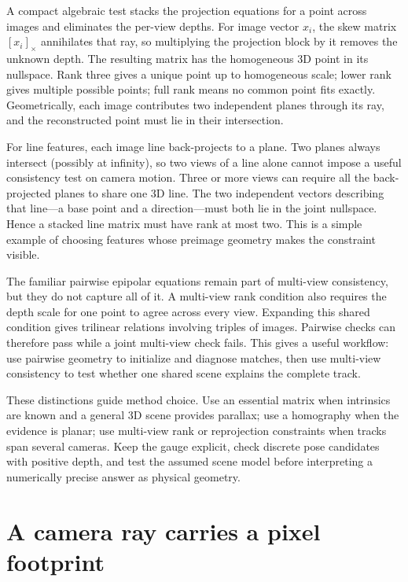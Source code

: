A compact algebraic test stacks the projection equations for a point across images and eliminates the per-view depths. For image vector \(x_i\), the skew matrix \([x_i]_\times\) annihilates that ray, so multiplying the projection block by it removes the unknown depth. The resulting matrix has the homogeneous 3D point in its nullspace. Rank three gives a unique point up to homogeneous scale; lower rank gives multiple possible points; full rank means no common point fits exactly. Geometrically, each image contributes two independent planes through its ray, and the reconstructed point must lie in their intersection.

For line features, each image line back-projects to a plane. Two planes always intersect (possibly at infinity), so two views of a line alone cannot impose a useful consistency test on camera motion. Three or more views can require all the back-projected planes to share one 3D line. The two independent vectors describing that line---a base point and a direction---must both lie in the joint nullspace. Hence a stacked line matrix must have rank at most two. This is a simple example of choosing features whose preimage geometry makes the constraint visible.

The familiar pairwise epipolar equations remain part of multi-view consistency, but they do not capture all of it. A multi-view rank condition also requires the depth scale for one point to agree across every view. Expanding this shared condition gives trilinear relations involving triples of images. Pairwise checks can therefore pass while a joint multi-view check fails. This gives a useful workflow: use pairwise geometry to initialize and diagnose matches, then use multi-view consistency to test whether one shared scene explains the complete track.

These distinctions guide method choice. Use an essential matrix when intrinsics are known and a general 3D scene provides parallax; use a homography when the evidence is planar; use multi-view rank or reprojection constraints when tracks span several cameras. Keep the gauge explicit, check discrete pose candidates with positive depth, and test the assumed scene model before interpreting a numerically precise answer as physical geometry.

\section{A camera ray carries a pixel footprint}\label{02-foundations-ii-ch036-a-camera-ray-carries-a-pixel-footprint}

